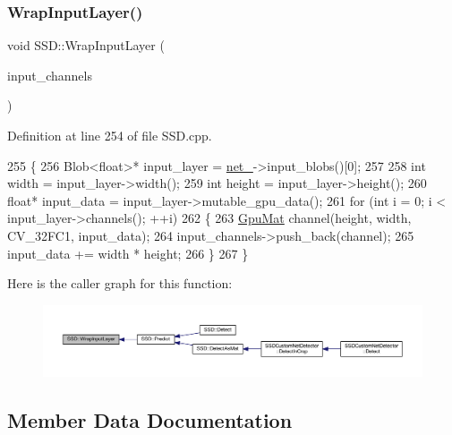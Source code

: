 \subsubsection{\texorpdfstring{Wrap\+Input\+Layer()}{WrapInputLayer()}}
{\footnotesize\ttfamily void S\+S\+D\+::\+Wrap\+Input\+Layer (\begin{DoxyParamCaption}\item[{std\+::vector$<$ \mbox{\hyperlink{gpu__allocator_8h_aa7700da124206551c0f9d273152f13fb}{Gpu\+Mat}} $>$ $\ast$}]{input\+\_\+channels }\end{DoxyParamCaption})\hspace{0.3cm}{\ttfamily [private]}}



Definition at line 254 of file S\+S\+D.\+cpp.


\begin{DoxyCode}
255 \{
256     Blob<float>* input\_layer = \mbox{\hyperlink{class_s_s_d_a9b70501b85252c3135030e5c6c1e7117}{net\_}}->input\_blobs()[0];
257 
258     \textcolor{keywordtype}{int} width = input\_layer->width();
259     \textcolor{keywordtype}{int} height = input\_layer->height();
260     \textcolor{keywordtype}{float}* input\_data = input\_layer->mutable\_gpu\_data();
261     \textcolor{keywordflow}{for} (\textcolor{keywordtype}{int} i = 0; i < input\_layer->channels(); ++i)
262     \{
263         \mbox{\hyperlink{gpu__allocator_8h_aa7700da124206551c0f9d273152f13fb}{GpuMat}} channel(height, width, CV\_32FC1, input\_data);
264         input\_channels->push\_back(channel);
265         input\_data += width * height;
266     \}
267 \}
\end{DoxyCode}
Here is the caller graph for this function\+:\nopagebreak
\begin{figure}[H]
\begin{center}
\leavevmode
\includegraphics[width=350pt]{class_s_s_d_aec550d5312257216d93955cdee13a73e_icgraph}
\end{center}
\end{figure}


\subsection{Member Data Documentation}
\mbox{\label{class_s_s_d_af45a3ca33b8adcb4b2e23ebd23891947}} 
